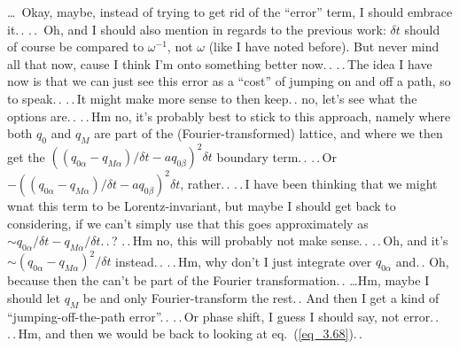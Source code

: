 \documentclass{report}
\begin{document}
\ldots\ Okay, maybe, instead of trying to get rid of the ``error'' term, I should embrace it.\,. .\,.\, Oh, and I should also mention in regards to the previous work: $\delta t$ should of course be compared to $\omega^{-1}$, not $\omega$ (like I have noted before). But never mind all that now, cause I think I'm onto something better now.\,. .\,.\,The idea I have now is that we can just see this error as a ``cost'' of jumping on and off a path, so to speak.\,. .\,.\,It might make more sense to then keep.\,. no, let's see what the options are.\,. .\,.\,Hm no, it's probably best to stick to this approach, namely where both $q_0$ and $q_M$ are part of the (Fourier-transformed) lattice, and where we then get the $((q_{0\alpha} - q_{M\alpha})/ \delta t - a q_{0\beta})^2\delta t$ boundary term.\,. .\,.\,Or $-((q_{0\alpha} - q_{M\alpha})/ \delta t - a q_{0\beta})^2\delta t$, rather.\,. .\,.\,I have been thinking that we might wnat this term to be Lorentz-invariant, but maybe I should get back to considering, if we can't simply use that this goes approximately as $\sim q_{0\alpha} / \delta t - q_{M\alpha} / \delta t$.\,.\,? .\,.\,Hm no, this will probably not make sense.\,. .\,.\,Oh, and it's $\sim (q_{0\alpha} - q_{M\alpha})^2 / \delta t$ instead.\,. .\,.\,Hm, why don't I just integrate over $q_{0\alpha}$ and.\,. Oh, because then the can't be part of the Fourier transformation.\,. \ldots Hm, maybe I should let $q_M$ be and only Fourier-transform the rest.\,. And then I get a kind of ``jumping-off-the-path error''.\,. .\,.\,Or phase shift, I guess I should say, not error.\,. .\,.\,Hm, and then we would be back to looking at eq.\ (\ref{eq_3.68}).\,.
\end{document}
